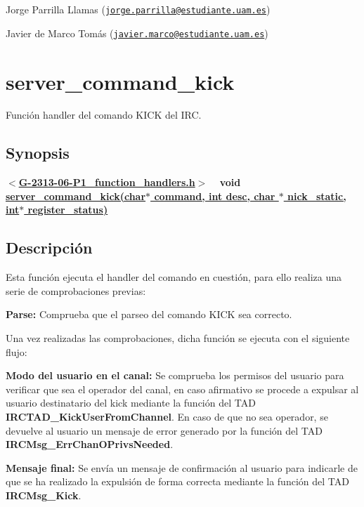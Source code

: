 \begin{DoxyItemize}
\item Jorge Parrilla Llamas (\href{mailto:jorge.parrilla@estudiante.uam.es}{\tt jorge.\+parrilla@estudiante.\+uam.\+es}) 
\item Javier de Marco Tomás (\href{mailto:javier.marco@estudiante.uam.es}{\tt javier.\+marco@estudiante.\+uam.\+es}) 
\end{DoxyItemize}\hypertarget{server_command_kick}{}\section{server\+\_\+command\+\_\+kick}\label{server_command_kick}
Función handler del comando K\+I\+C\+K del I\+R\+C.\hypertarget{server_command_kick_synopsis_kick}{}\subsection{Synopsis}\label{server_command_kick_synopsis_kick}
{ {\bfseries $<$\hyperlink{G-2313-06-P1__function__handlers_8h}{G-\/2313-\/06-\/\+P1\+\_\+function\+\_\+handlers.\+h}$>$} ~\newline
 {\bfseries void \hyperlink{G-2313-06-P1__function__handlers_8c_a33025bd9c7bf8fbb2bf9cf722c07465c}{server\+\_\+command\+\_\+kick(char$\ast$ command, int desc, char $\ast$ nick\+\_\+static, int$\ast$ register\+\_\+status)}} } \hypertarget{server_command_kick_descripcion_kick}{}\subsection{Descripción}\label{server_command_kick_descripcion_kick}
Esta función ejecuta el handler del comando en cuestión, para ello realiza una serie de comprobaciones previas\+:


\begin{DoxyItemize}
\item {\bfseries Parse\+:} Comprueba que el parseo del comando K\+I\+C\+K sea correcto. 
\end{DoxyItemize}

Una vez realizadas las comprobaciones, dicha función se ejecuta con el siguiente flujo\+:


\begin{DoxyItemize}
\item {\bfseries Modo del usuario en el canal\+:} Se comprueba los permisos del usuario para verificar que sea el operador del canal, en caso afirmativo se procede a expulsar al usuario destinatario del kick mediante la función del T\+A\+D {\bfseries I\+R\+C\+T\+A\+D\+\_\+\+Kick\+User\+From\+Channel}. En caso de que no sea operador, se devuelve al usuario un mensaje de error generado por la función del T\+A\+D {\bfseries I\+R\+C\+Msg\+\_\+\+Err\+Chan\+O\+Privs\+Needed}.  
\item {\bfseries Mensaje final\+:} Se envía un mensaje de confirmación al usuario para indicarle de que se ha realizado la expulsión de forma correcta mediante la función del T\+A\+D {\bfseries I\+R\+C\+Msg\+\_\+\+Kick}.  
\end{DoxyItemize}

